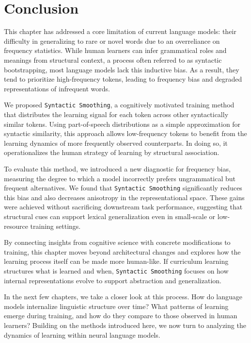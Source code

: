\section{Conclusion}
\label{sec:conclusion}

This chapter has addressed a core limitation of current language models: their difficulty in generalizing to rare or novel words due to an overreliance on frequency statistics. While human learners can infer grammatical roles and meanings from structural context, a process often referred to as syntactic bootstrapping, most language models lack this inductive bias. As a result, they tend to prioritize high-frequency tokens, leading to frequency bias and degraded representations of infrequent words.

We proposed \texttt{Syntactic Smoothing}, a cognitively motivated training method that distributes the learning signal for each token across other syntactically similar tokens. Using part-of-speech distributions as a simple approximation for syntactic similarity, this approach allows low-frequency tokens to benefit from the learning dynamics of more frequently observed counterparts. In doing so, it operationalizes the human strategy of learning by structural association.

To evaluate this method, we introduced a new diagnostic for frequency bias, measuring the degree to which a model incorrectly prefers ungrammatical but frequent alternatives. We found that \texttt{Syntactic Smoothing} significantly reduces this bias and also decreases anisotropy in the representational space. These gains were achieved without sacrificing downstream task performance, suggesting that structural cues can support lexical generalization even in small-scale or low-resource training settings.

By connecting insights from cognitive science with concrete modifications to training, this chapter moves beyond architectural changes and explores how the learning process itself can be made more human-like. If curriculum learning structures what is learned and when, \texttt{Syntactic Smoothing} focuses on how internal representations evolve to support abstraction and generalization.

In the next few chapters, we take a closer look at this process. How do language models internalize linguistic structure over time? What patterns of learning emerge during training, and how do they compare to those observed in human learners? Building on the methods introduced here, we now turn to analyzing the dynamics of learning within neural language models.
